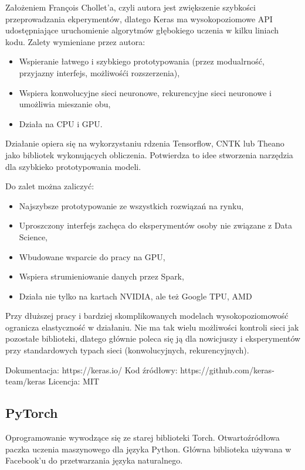 \documentclass[12pt,a4paper,twoside,titlepage,openright]{book}
\begin{document}
Założeniem François Chollet'a, czyli autora jest zwiększenie szybkości przeprowadzania ekperymentów, dlatego Keras ma wysokopoziomowe API udostępniające uruchomienie algorytmów głębokiego uczenia w kilku liniach kodu. Zalety wymieniane przez autora:
\begin{itemize}
\item Wspieranie łatwego i szybkiego prototypowania (przez modualrność, przyjazny interfejs, możliwośći rozszerzenia),
\item Wspiera konwolucyjne sieci neuronowe, rekurencyjne sieci neuronowe i umożliwia mieszanie obu,
\item Działa na CPU i GPU.
\end{itemize}

Działanie opiera się na wykorzystaniu rdzenia Tensorflow, CNTK lub Theano jako bibliotek wykonujących obliczenia. Potwierdza to idee stworzenia narzędzia dla szybkieko prototypowania modeli.

Do zalet można zaliczyć:
\begin{itemize}
\item Najszybsze prototypowanie ze wszystkich rozwiązań na rynku,
\item Uproszczony interfejs zachęca do eksperymentów osoby nie związane z Data Science,
\item Wbudowane wsparcie do pracy na GPU,
\item Wspiera strumieniowanie danych przez Spark,
\item Działa nie tylko na kartach NVIDIA, ale też Google TPU, AMD
\end{itemize}

Przy dłuższej pracy i bardziej skomplikowanych modelach wysokopoziomowość ogranicza elastyczność w działaniu. Nie ma tak wielu możliwości kontroli sieci jak pozostałe biblioteki, dlatego głównie poleca się ją dla nowicjuszy i eksperymentów przy standardowych typach sieci (konwolucyjnych, rekurencyjnych).

\noindent
\newline 
Dokumentacja: https://keras.io/
\newline 
Kod źródłowy: https://github.com/keras-team/keras
\newline 
Licencja: MIT

\subsection{PyTorch}
Oprogramowanie wywodzące się ze starej biblioteki Torch. Otwartoźródłowa paczka uczenia maszynowego dla języka Python. Główna biblioteka używana w Facebook'u do przetwarzania języka naturalnego. 
\end{document}
